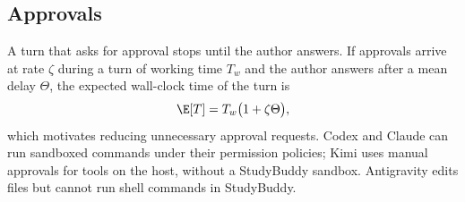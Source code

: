 \subsection{Approvals}

A turn that asks for approval stops until the author answers. If approvals
arrive at rate $\zeta$ during a turn of working time $T_w$ and the author
answers after a mean delay $\Theta$, the expected wall-clock time of the turn is
\begin{equation}
  \E[T] = T_w \bigl(1 + \zeta \Theta\bigr),
  \label{eq:approvals}
\end{equation}
which motivates reducing unnecessary approval requests. Codex and Claude can
run sandboxed commands under their permission policies; Kimi uses manual
approvals for tools on the host, without a StudyBuddy sandbox. Antigravity edits
files but cannot run shell commands in StudyBuddy.
